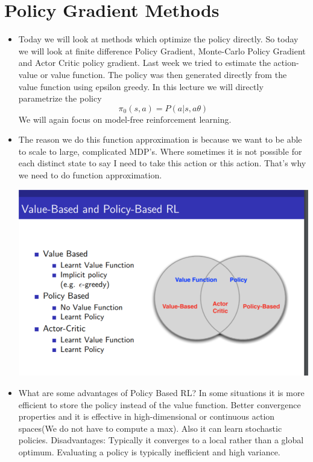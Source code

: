 \documentclass[a4paper]{article}
\begin{document}
\section{Policy Gradient Methods}
\begin{itemize}
    \item Today we will look at methods which optimize the policy directly. So today we will look at finite difference Policy Gradient, Monte-Carlo Policy Gradient and Actor Critic policy gradient. Last week we tried to estimate the action-value or value function. The policy was then generated directly from the value function using epsilon greedy. In this lecture we will directly parametrize the policy $$\pi_0(s,a) = P(a|s,a\theta)$$
    We will again focus on model-free reinforcement learning. 
    \item The reason we do this function approximation is because we want to be able to scale to large, complicated MDP's. Where sometimes it is not possible for each distinct state to say I need to take this action or this action. That's why we need to do function approximation. 
     \begin{center}
    \includegraphics[width = \textwidth]{images/algorithm_overview.png}
    \end{center}
    \item What are some advantages of Policy Based RL? In some situations it is more efficient to store the policy instead of the value function. Better convergence properties and it is effective in high-dimensional or continuous action spaces(We do not have to compute a max). Also it can learn stochastic policies. 
    \newline 
    Disadvantages: Typically it converges to a local rather than a global optimum. Evaluating a policy is typically inefficient and high variance. 

\end{itemize}
\end{document}
